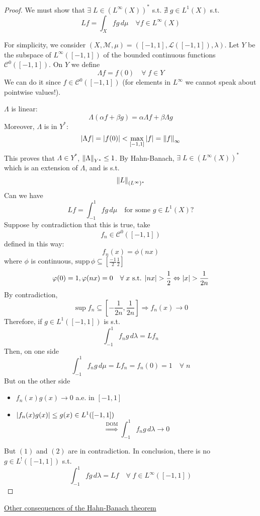 \begin{proof}
    We must show that \(\exists \; L \in (L^\infty(X))^*\) s.t. \(\nexists \; g \in L^1(X)\) s.t. 
    \[
        Lf = \int_X fg \, d\mu \quad \forall f \in L^\infty(X)
    \]

For simplicity, we consider \((X, \mathcal{M}, \mu) = ([-1, 1], \mathcal{L}([-1,1]), \lambda)\). Let \(Y\) be the subspace of \(L^\infty([-1,1])\) of the bounded continuous functions \(\mathcal{C}^0([-1,1])\). On \(Y\) we define 
\[
    \Lambda f = f(0) \quad \forall \; f \in Y
\]
We can do it since \(f \in \mathcal{C}^0([-1,1])\) (for elements in \(L^\infty\) we cannot speak about pointwise values!). 

\(\Lambda\) is linear:
\[
    \Lambda(\alpha f + \beta g) = \alpha \Lambda f + \beta \Lambda g
\]
Moreover, \(\Lambda\) is in \(Y^*\):
\[
    \abs{\Lambda f} = \abs{f(0)} < \max_{[-1,1]} \abs{f} = \norm{f}_{\infty}
\]
This proves that \(\Lambda \in Y^*\), \(\norm{\Lambda}_{Y^*} \leq 1\). By Hahn-Banach, \(\exists \; L \in (L^\infty(X))^*\) which is an extension of \(\Lambda\), and is s.t. 
\[
    \norm{L}_{(L^\infty)^*}
\]
Can we have 
\[
    Lf=\int_{-1}^1 fg \, d\mu \quad \mbox{for some } g \in L^1(X)\mbox{?}
\]
Suppose by contradiction that this is true, take 
\[
    f_n \in \mathcal{C}^0([-1,1])
\]
defined in this way:
\[
    f_n(x) = \phi(nx)
\]
where \(\phi\) is continuous, \(\mbox{supp}\, \phi \subseteq \left[ \frac{-1}{2} \frac{1}{2} \right]\) 
\[
    \varphi(0) = 1, \varphi(nx) = 0 \quad \forall \; x \mbox{ s.t. } \abs{nx} > \frac{1}{2} \Leftrightarrow \abs{x} > \frac{1}{2n}  
\]
By contradiction, 
\[
    \sup f_n \subseteq \left[-\frac{1}{2n}, \frac{1}{2n}\right] \Rightarrow f_n(x) \to 0
\]
Therefore, if \(g \in L^1([-1,1])\) is s.t. 
\[
    \int_{-1}^1 f_n g \, d\lambda = L f_n
\]
Then, on one side 
\[
    \int_{-1}^1 f_n g \, d\mu = L f_n = f_n (0) = 1 \quad \forall \; n
\tag*{(1)}\]
But on the other side 
\begin{itemize}
    \item \(f_n(x)g(x) \to 0\) a.e. in \([-1,1]\)
    \item \(\abs{f_n(x) g(x)} \leq g(x) \in L^1([-1,1])\)
    \[
        \overset{\mbox{DOM}}{\Rightarrow} \int_{-1}^1 f_n g \, d\lambda \to 0
    \tag*{(2)}\]
\end{itemize}
But \((1)\) and \((2)\) are in contradiction.
In conclusion, there is no \(g \in L^!([-1,1])\) s.t. 
\[
    \int_{-1}^1 f g \, d\lambda = L f \quad \forall \; f \in L^\infty ([-1,1])
\]
\end{proof}
\noindent\underline{Other consequences of the Hahn-Banach theorem}
